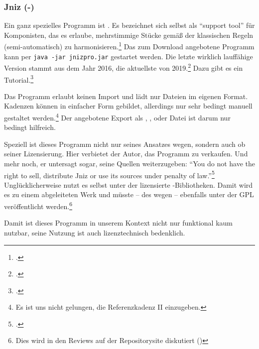 %
%
%




\subsubsection{Jniz (-)}

\label{Jniz}Ein ganz spezielles Programm ist . Es bezeichnet sich
selbst als \enquote{support tool} für Komponisten, das es erlaube, mehrstimmige
Stücke gemäß der klassischen Regeln (semi-automatisch) zu
harmonisieren.\footcite[vgl.][\nopage wp]{Grandjean2019a} Das zum Download
angebotene Programm kann per \texttt{java -jar jnizpro.jar} gestartet werden.
Die letzte wirklich lauffähige Version stammt aus dem Jahr 2016, die aktuellste
von 2019.\footcite[vgl.][\nopage wp]{Jniz2019b} Dazu gibt es ein
Tutorial.\footcite[vgl.][\nopage wp]{Grandjean2019c}

Das Programm erlaubt keinen Import und lädt nur Dateien im eigenen Format.
Kadenzen können in einfacher Form gebildet, allerdings nur sehr bedingt manuell
gestaltet werden.\footnote{Es ist uns nicht gelungen, die Referenzkadenz II
einzugeben.} Der angebotene Export als , ,
 oder Datei ist darum nur bedingt hilfreich.

Speziell ist dieses Programm nicht nur seines Ansatzes wegen, sondern auch ob
seiner Lizensierung. Hier verbietet der Autor, das Programm zu verkaufen. Und
mehr noch, er untersagt sogar, seine Quellen weiterzugeben: \enquote{You do not
have the right to sell, distribute Jniz or use its sources under penalty of
law.}\footcite[vgl.][\nopage wp]{Grandjean2019b} Unglücklicherweise nutzt es
selbst unter der  lizensierte -Bibliotheken. Damit wird
es zu einem abgeleiteten Werk und müsste -- des  wegen --
ebenfalls unter der GPL veröffentlicht werden.\footnote{Dies wird in den Reviews
auf der Repositorysite diskutiert (\cite[vgl.][\nopage wp]{Jniz2019a})}

Damit ist dieses Programm in unserem Kontext nicht nur funktional kaum nutzbar,
seine Nutzung ist auch lizenztechnisch bedenklich.



%
